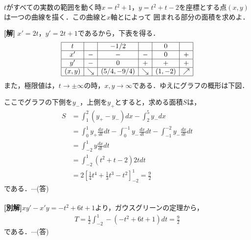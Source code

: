 \documentclass[a4j]{jarticle}
\begin{document}

     \begin{oframed}
     $t$がすべての実数の範囲を動く時$x=t^2+1$，$y=t^2+t-2$を座標とする点$(x,y)$は一つの曲線を描く．この曲線と$x$軸とによって
     囲まれる部分の面積を求めよ．
     \end{oframed}

\setlength{\columnseprule}{0.4pt}
\begin{multicols}{2}
{\bf[解]} $x'=2t$，$y'=2t+1$であるから，下表を得る．
     \begin{align*}
          \begin{array}{|c|c|c|c|c|c|} \hline
          t      &    &-1/2          &   & 0     &  \\ \hline
          x'     & -  & -              &- &0       &+ \\ \hline
          y'     & -  & 0             &+&+       & + \\ \hline
          (x,y)&\searrow&(5/4,-9/4) &\searrow&(1,-2)&\nearrow \\ \hline      
          \end{array}
     \end{align*}
また，極限値は，$t\to\pm\infty$の時，$x,y\to\infty$である．ゆえにグラフの概形は下図．
     \begin{center}
     \scalebox{1}{}
     \end{center}

ここでグラフの下側を$y_-$，上側を$y_+$とすると，求める面積$S$は，
     \begin{align*}
     S&=\int_1^2(y_+-y_-)dx-\int_2^5y_-dx \\
     &=\int_0^1y_+\frac{dx}{dt}dt-\int_0^{-1}y_-\frac{dx}{dt}dt-\int_{-1}^{-2}y_-\frac{dx}{dt}dt \\
     &=\int_{-2}^1y\frac{dx}{dt}dt \\
     &=\int_{-2}^1(t^2+t-2)2tdt \\
     &=2\left[\frac{1}{4}t^4+\frac{1}{3}t^3-t^2\right]_{-2}^1=\frac{9}{2}
     \end{align*}
である．$\cdots$(答)
  \\ \\
{\bf[別解]}$xy'-x'y=-t^2+6t+1$より，ガウスグリーンの定理から，
     \begin{align*}
     T=\frac{1}{2}\int_{-2}^1-(-t^2+6t+1)dt=\frac{9}{2}
     \end{align*}     
である．$\cdots$(答)     
\newpage
\end{multicols}
\end{document}
